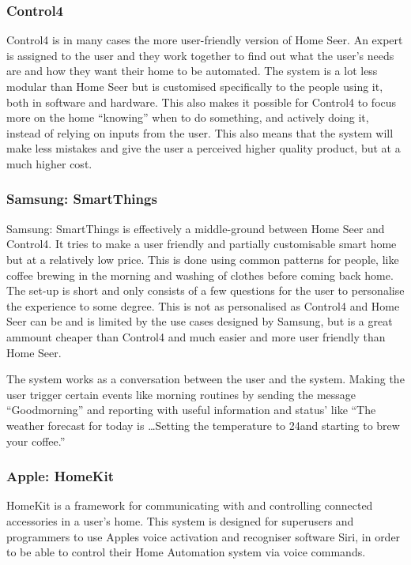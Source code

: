 \subsubsection{Control4}
Control4 is in many cases the more user-friendly version of Home Seer. An expert is assigned to the user and they work together to find out what the user's needs are and how they want their home to be automated. The system is a lot less modular than Home Seer but is customised specifically to the people using it, both in software and hardware. This also makes it possible for Control4 to focus more on the home \enquote{knowing} when to do something, and actively doing it, instead of relying on inputs from the user. This also means that the system will make less mistakes and give the user a perceived higher quality product, but at a much higher cost.%

\subsubsection{Samsung: SmartThings}
Samsung: SmartThings is effectively a middle-ground between Home Seer and Control4. It tries to make a user friendly and partially customisable smart home but at a relatively low price. This is done using common patterns for people, like coffee brewing in the morning and washing of clothes before coming back home. The set-up is short and only consists of a few questions for the user to personalise the experience to some degree. This is not as personalised as Control4 and Home Seer can be and is limited by the use cases designed by Samsung, but is a great ammount cheaper than Control4 and much easier and more user friendly than Home Seer.

The system works as a conversation between the user and the system. Making the user trigger certain events like morning routines by sending the message \enquote{Goodmorning} and reporting with useful information and status' like \enquote{The weather forecast for today is \dots Setting the temperature to 24\degree and starting to brew your coffee.}

\subsubsection{Apple: HomeKit}
HomeKit is a framework for communicating with and controlling connected accessories in a user's home. %
This system is designed for superusers and programmers to use Apples voice activation and recogniser software Siri, in order to be able to control their Home Automation system via voice commands.

